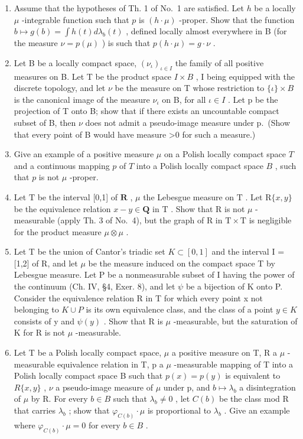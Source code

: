 \begin{enumerate}
\def\labelenumi{\arabic{enumi})}
\item
  Assume that the hypotheses of Th. 1 of No.~1 are satisfied. Let \(h\) be a locally \(\mu\) -integrable function such that \(p\) is \((h \cdot \mu)\) -proper. Show that the function \(b \mapsto g(b) = \int h(t) d\lambda_b(t)\) , defined locally almost everywhere in B (for the measure \(\nu = p(\mu)\) ) is such that \(p(h \cdot \mu) = g \cdot \nu\) .
\item
  Let B be a locally compact space, \((\nu_{\iota})_{\iota\in I}\) the family of all positive measures on B. Let T be the product space \(I\times B\) , I being equipped with the discrete topology, and let \(\nu\) be the measure on T whose restriction to \(\{\iota\}\times B\) is the canonical image of the measure \(\nu_{\iota}\) on B, for all \(\iota\in I\) . Let p be the projection of T onto B; show that if there exists an uncountable compact subset of B, then \(\nu\) does not admit a pseudo-image measure under p.~(Show that every point of B would have measure \textgreater0 for such a measure.)
\item
  Give an example of a positive measure \(\mu\) on a Polish locally compact space \(T\) and a continuous mapping \(p\) of \(T\) into a Polish locally compact space \(B\) , such that \(p\) is not \(\mu\) -proper.
\item
  Let \(\mathrm{T}\) be the interval {[}0,1{]} of \(\mathbf{R}\) , \(\mu\) the Lebesgue measure on \(\mathrm{T}\) . Let \(\mathrm{R}\{x,y\}\) be the equivalence relation \(x - y \in \mathbf{Q}\) in \(\mathrm{T}\) . Show that \(\mathrm{R}\) is not \(\mu\) -measurable (apply Th. 3 of No.~4), but the graph of \(\mathrm{R}\) in \(\mathrm{T} \times \mathrm{T}\) is negligible for the product measure \(\mu \otimes \mu\) .
\item
  Let T be the union of Cantor's triadic set \(K \subset [0,1]\) and the interval I = {[}1,2{]} of R, and let \(\mu\) be the measure induced on the compact space T by Lebesgue measure. Let P be a nonmeasurable subset of I having the power of the continuum (Ch. IV, §4, Exer. 8), and let \(\psi\) be a bijection of K onto P. Consider the equivalence relation R in T for which every point x not belonging to \(K \cup P\) is its own equivalence class, and the class of a point \(y \in K\) consists of y and \(\psi(y)\) . Show that R is \(\mu\) -measurable, but the saturation of K for R is not \(\mu\) -measurable.
\item
  Let T be a Polish locally compact space, \(\mu\) a positive measure on T, R a \(\mu\) -measurable equivalence relation in T, p a \(\mu\) -measurable mapping of T into a Polish locally compact space B such that \(p(x) = p(y)\) is equivalent to \(R\{x, y\}\) , \(\nu\) a pseudo-image measure of \(\mu\) under p, and \(b \mapsto \lambda_b\) a disintegration of \(\mu\) by R. For every \(b \in B\) such that \(\lambda_b \neq 0\) , let \(C(b)\) be the class mod R that carries \(\lambda_b\) ; show that \(\varphi_{C(b)} \cdot \mu\) is proportional to \(\lambda_b\) . Give an example where \(\varphi_{C(b)} \cdot \mu = 0\) for every \(b \in B\) .

\end{enumerate}

